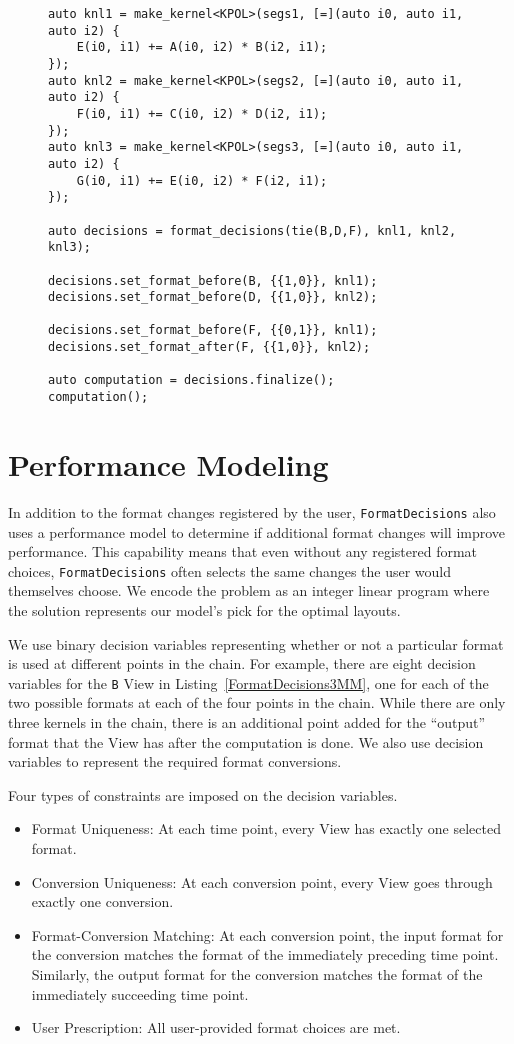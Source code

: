 \documentclass[sigconf, table]{acmart}
\begin{document}
\begin{figure}
\begin{lstlisting}[caption={The 3MM benchmark implemented using FormatDecisions.},
	label={FormatDecisions3MM}]
auto knl1 = make_kernel<KPOL>(segs1, [=](auto i0, auto i1, auto i2) {
	E(i0, i1) += A(i0, i2) * B(i2, i1);
});
auto knl2 = make_kernel<KPOL>(segs2, [=](auto i0, auto i1, auto i2) {
	F(i0, i1) += C(i0, i2) * D(i2, i1);
});
auto knl3 = make_kernel<KPOL>(segs3, [=](auto i0, auto i1, auto i2) {
	G(i0, i1) += E(i0, i2) * F(i2, i1);
});

auto decisions = format_decisions(tie(B,D,F), knl1, knl2, knl3);

decisions.set_format_before(B, {{1,0}}, knl1);
decisions.set_format_before(D, {{1,0}}, knl2);

decisions.set_format_before(F, {{0,1}}, knl1);
decisions.set_format_after(F, {{1,0}}, knl2);

auto computation = decisions.finalize();
computation();
\end{lstlisting}
\end{figure}

\section{Performance Modeling}

In addition to the format changes registered by the user, \verb.FormatDecisions. also uses a performance model to determine if additional format changes will improve performance. 
This capability means that even without any registered format choices, \verb.FormatDecisions. often selects the same changes the user would themselves choose. 
We encode the problem as an integer linear program where the solution represents our model's pick for the optimal layouts.


We use binary decision variables representing whether or not a particular format is used at different points in the chain. 
For example, there are eight decision variables for the \verb.B. View in Listing~\ref{FormatDecisions3MM}, one for each of the two possible formats at each of the four points in the chain. 
While there are only three kernels in the chain, there is an additional point added for the \enquote{output} format that the View has after the computation is done. 
We also use decision variables to represent the required format conversions.

Four types of constraints are imposed on the decision variables.
\begin{itemize}
\item Format Uniqueness: At each time point, every View has exactly one selected format. 
\item Conversion Uniqueness: At each conversion point, every View goes through exactly one conversion.
\item Format-Conversion Matching: At each conversion point, the input format for the conversion matches the format of the immediately preceding time point. Similarly, the output format for the conversion matches the format of the immediately succeeding time point.
\item User Prescription: All user-provided format choices are met.
\end{itemize}
\end{document}
